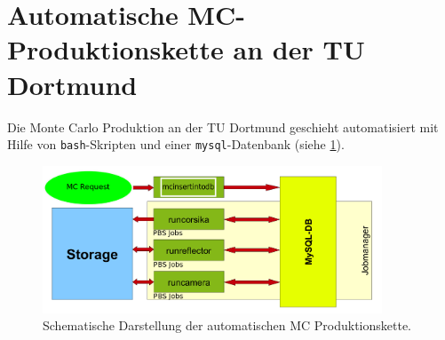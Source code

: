 




\section{Automatische MC-Produktionskette an der TU Dortmund}
\label{sec:Automatische MC-Produktion}

Die Monte Carlo Produktion an der TU Dortmund geschieht automatisiert mit Hilfe von \texttt{bash}-Skripten und einer \texttt{mysql}-Datenbank (siehe \ref{Jobmanager}).

\begin{figure}
    \centering
    \includegraphics[width=0.9\textwidth]{./Plots/03_MonteCarlos/Jobmanager.png}
    \caption{Schematische Darstellung der automatischen MC Produktionskette.}
    \label{Jobmanager}
\end{figure}


